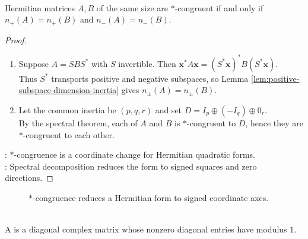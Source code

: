 \begin{theorem} \label{thm:sylvester-inertia-theorem-hermitian} \\
Hermitian matrices $A,B$ of the same size are $*$-congruent if and only if $n_+(A)=n_+(B)$ and $n_-(A)=n_-(B)$.
\begin{proof}
\begin{enumerate}[label=\roman*.]
\setlength{\itemsep}{0pt}
\item[$(\Rightarrow)$] Suppose $A=SBS^*$ with $S$ invertible. Then $\mathbf{x}^*A\mathbf{x}=(S^*\mathbf{x})^*B(S^*\mathbf{x})$.\\
Thus $S^*$ transports positive and negative subspaces, so Lemma \ref{lem:positive-subspace-dimension-inertia} gives $n_\pm(A)=n_\pm(B)$.
\item[$(\Leftarrow)$] Let the common inertia be $(p,q,r)$ and set $D=I_p\oplus(-I_q)\oplus0_r$.\\
By the spectral theorem, each of $A$ and $B$ is $*$-congruent to $D$, hence they are $*$-congruent to each other.
\end{enumerate}
: $*$-congruence is a coordinate change for Hermitian quadratic forms.\\
: Spectral decomposition reduces the form to signed squares and zero directions.
\end{proof}
\end{theorem}

\begin{figure}[H]
  \centering
  
  \caption{$*$-congruence reduces a Hermitian form to signed coordinate axes.}
  \label{fig:sylvester-inertia-congruence}
\end{figure}

\begin{definition} \label{def:phase-inertia-matrix} \\
A  is a diagonal complex matrix whose nonzero diagonal entries have modulus $1$.
\end{definition}

